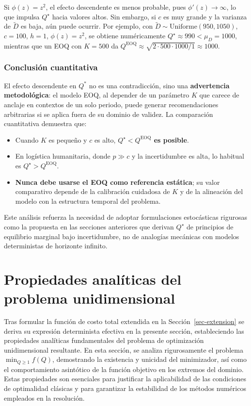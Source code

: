 \documentclass[
  spanish,
  us-letterpaper,
]{scrreprt}
\providecommand{\tightlist}{%
  \setlength{\itemsep}{0pt}\setlength{\parskip}{0pt}}
\numberwithin{equation}{section}
\begin{document}
Si \(\phi(z) = z^2\), el efecto descendente es menos probable, pues
\(\phi'(z) \to \infty\), lo que impulsa \(Q^\star\) hacia valores altos.
Sin embargo, si \(c\) es muy grande y la varianza de \(\tilde{D}\) es
baja, aún puede ocurrir. Por ejemplo, con
\(\tilde{D} \sim \text{Uniforme}(950, 1050)\), \(c = 100\), \(h = 1\),
\(\phi(z) = z^2\), se obtiene numéricamente
\(Q^\star \approx 990 < \mu_D = 1000\), mientras que un EOQ con
\(K = 500\) da
\(Q^{\text{EOQ}} \approx \sqrt{2 \cdot 500 \cdot 1000 / 1} \approx 1000\).

\subsubsection{Conclusión
cuantitativa}\label{conclusiuxf3n-cuantitativa}

El efecto descendente en \(Q^*\) no es una contradicción, sino una
\textbf{advertencia metodológica}: el modelo EOQ, al depender de un
parámetro \(K\) que carece de anclaje en contextos de un solo periodo,
puede generar recomendaciones arbitrarias si se aplica fuera de su
dominio de validez. La comparación cuantitativa demuestra que:

\begin{itemize}
\tightlist
\item
  Cuando \(K\) es pequeño y \(c\) es alto,
  \textbf{\(Q^\star < Q^{\text{EOQ}}\) es posible}.
\item
  En logística humanitaria, donde \(p \gg c\) y la incertidumbre es
  alta, lo habitual es \(Q^\star > Q^{\text{EOQ}}\).
\item
  \textbf{Nunca debe usarse el EOQ como referencia estática}; su valor
  comparativo depende de la calibración cuidadosa de \(K\) y de la
  alineación del modelo con la estructura temporal del problema.
\end{itemize}

Este análisis refuerza la necesidad de adoptar formulaciones
estocásticas rigurosas como la propuesta en las secciones anteriores que
derivan \(Q^\star\) de principios de equilibrio marginal bajo
incertidumbre, no de analogías mecánicas con modelos deterministas de
horizonte infinito.

\section{Propiedades analíticas del problema
unidimensional}\label{sec-propiedades}

Tras formular la función de costo total extendida en la
Sección~\ref{sec-extension} se deriva su expresión determinista efectiva
en la presente sección, estableciendo las propiedades analíticas
fundamentales del problema de optimización unidimensional resultante. En
esta sección, se analiza rigurosamente el problema
\(\min_{Q \geq 1} f(Q)\), demostrando la existencia y unicidad del
minimizador, así como el comportamiento asintótico de la función
objetivo en los extremos del dominio. Estas propiedades son esenciales
para justificar la aplicabilidad de las condiciones de optimalidad
clásicas y para garantizar la estabilidad de los métodos numéricos
empleados en la resolución.
\end{document}
